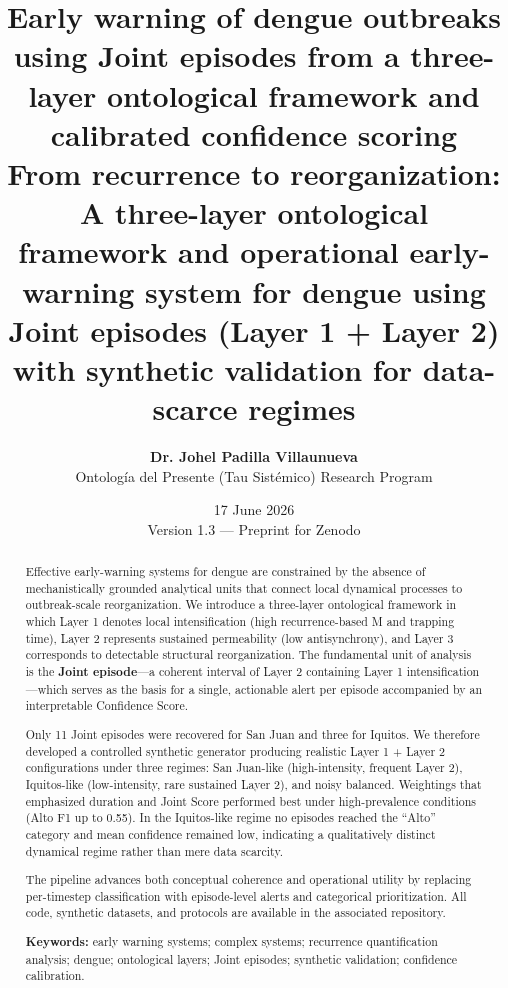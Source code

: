 \documentclass[11pt,a4paper]{article}
\title{\textbf{Early warning of dengue outbreaks using Joint episodes from a three-layer ontological framework and calibrated confidence scoring}\\[0.35em]
\large From recurrence to reorganization: A three-layer ontological framework and operational early-warning system for dengue using Joint episodes (Layer 1 + Layer 2) with synthetic validation for data-scarce regimes}
\author{
    \textbf{Dr. Johel Padilla Villaunueva} \\[0.25em]
    \small Ontolog\'ia del Presente (Tau Sist\'emico) Research Program
}
\date{17 June 2026 \\ \small Version 1.3 — Preprint for Zenodo}
\begin{document}
\maketitle

\begin{abstract}
\noindent Effective early-warning systems for dengue are constrained by the absence of mechanistically grounded analytical units that connect local dynamical processes to outbreak-scale reorganization. We introduce a three-layer ontological framework in which Layer 1 denotes local intensification (high recurrence-based M and trapping time), Layer 2 represents sustained permeability (low antisynchrony), and Layer 3 corresponds to detectable structural reorganization. The fundamental unit of analysis is the \textbf{Joint episode}—a coherent interval of Layer 2 containing Layer 1 intensification—which serves as the basis for a single, actionable alert per episode accompanied by an interpretable Confidence Score.

Only 11 Joint episodes were recovered for San Juan and three for Iquitos. We therefore developed a controlled synthetic generator producing realistic Layer 1 + Layer 2 configurations under three regimes: San Juan-like (high-intensity, frequent Layer 2), Iquitos-like (low-intensity, rare sustained Layer 2), and noisy balanced. Weightings that emphasized duration and Joint Score performed best under high-prevalence conditions (Alto F1 up to 0.55). In the Iquitos-like regime no episodes reached the ``Alto'' category and mean confidence remained low, indicating a qualitatively distinct dynamical regime rather than mere data scarcity.

The pipeline advances both conceptual coherence and operational utility by replacing per-timestep classification with episode-level alerts and categorical prioritization. All code, synthetic datasets, and protocols are available in the associated repository.

\vspace{0.2em}
\noindent\textbf{Keywords:} early warning systems; complex systems; recurrence quantification analysis; dengue; ontological layers; Joint episodes; synthetic validation; confidence calibration.
\end{abstract}
\end{document}
